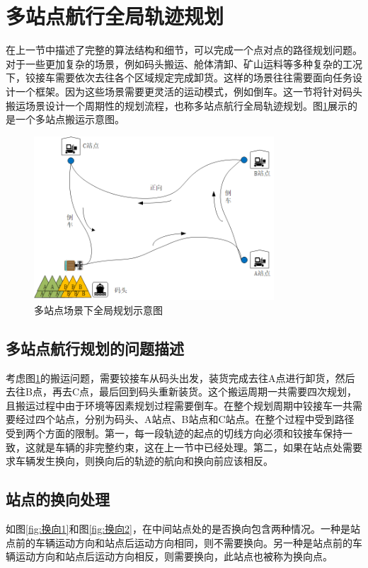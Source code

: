 \documentclass[master,academic]{ysuthesis} %
\begin{document}
	\section{多站点航行全局轨迹规划}
	在上一节中描述了完整的算法结构和细节，可以完成一个点对点的路径规划问题。对于一些更加复杂的场景，例如码头搬运、舱体清卸、矿山运料等多种复杂的工况下，铰接车需要依次去往各个区域规定完成卸货。这样的场景往往需要面向任务设计一个框架。因为这些场景需要更灵活的运动模式，例如倒车。这一节将针对码头搬运场景设计一个周期性的规划流程，也称多站点航行全局轨迹规划。图\ref{fig:全局规划}展示的是一个多站点搬运示意图。
	\begin{figure}[H]
		\centering
		\includegraphics[width=0.8\textwidth]{全局规划.png}
		\caption{多站点场景下全局规划示意图}
		\label{fig:全局规划}
	\end{figure}
		\subsection{多站点航行规划的问题描述}
		考虑图\ref{fig:全局规划}的搬运问题，需要铰接车从码头出发，装货完成去往A点进行卸货，然后去往B点，再去C点，最后回到码头重新装货。这个搬运周期一共需要四次规划，且搬运过程中由于环境等因素规划过程需要倒车。在整个规划周期中铰接车一共需要经过四个站点，分别为码头、A站点、B站点和C站点。在整个过程中受到路径受到两个方面的限制。第一，每一段轨迹的起点的切线方向必须和铰接车保持一致，这就是车辆的非完整约束，这在上一节中已经处理。第二，如果在站点处需要求车辆发生换向，则换向后的轨迹的航向和换向前应该相反。 
		

		\subsection{站点的换向处理}
		如图\ref{fig:换向1}和图\ref{fig:换向2}，在中间站点处的是否换向包含两种情况。一种是站点前的车辆运动方向和站点后运动方向相同，则不需要换向。另一种是站点前的车辆运动方向和站点后运动方向相反，则需要换向，此站点也被称为换向点。
\end{document}

